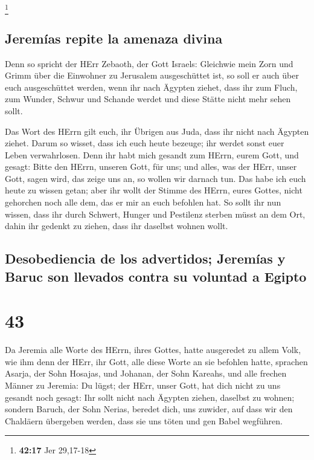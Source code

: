 \footnote{\textbf{42:17} Jer 29,17-18}

\hypertarget{jeremuxedas-repite-la-amenaza-divina}{%
\subsection{Jeremías repite la amenaza
divina}\label{jeremuxedas-repite-la-amenaza-divina}}

 Denn so spricht der HErr Zebaoth, der Gott Israels:
Gleichwie mein Zorn und Grimm über die Einwohner zu Jerusalem
ausgeschüttet ist, so soll er auch über euch ausgeschüttet werden, wenn
ihr nach Ägypten ziehet, dass ihr zum Fluch, zum Wunder, Schwur und
Schande werdet und diese Stätte nicht mehr sehen sollt.

 Das Wort des HErrn gilt euch, ihr Übrigen aus Juda, dass
ihr nicht nach Ägypten ziehet. Darum so wisset, dass ich euch heute
bezeuge;  ihr werdet sonst euer Leben verwahrlosen. Denn
ihr habt mich gesandt zum HErrn, eurem Gott, und gesagt: Bitte den
HErrn, unseren Gott, für uns; und alles, was der HErr, unser Gott, sagen
wird, das zeige uns an, so wollen wir darnach tun.  Das
habe ich euch heute zu wissen getan; aber ihr wollt der Stimme des
HErrn, eures Gottes, nicht gehorchen noch alle dem, das er mir an euch
befohlen hat.  So sollt ihr nun wissen, dass ihr durch
Schwert, Hunger und Pestilenz sterben müsst an dem Ort, dahin ihr
gedenkt zu ziehen, dass ihr daselbst wohnen wollt.

\hypertarget{desobediencia-de-los-advertidos-jeremuxedas-y-baruc-son-llevados-contra-su-voluntad-a-egipto}{%
\subsection{Desobediencia de los advertidos; Jeremías y Baruc son
llevados contra su voluntad a
Egipto}\label{desobediencia-de-los-advertidos-jeremuxedas-y-baruc-son-llevados-contra-su-voluntad-a-egipto}}

\hypertarget{section-42}{%
\section{43}\label{section-42}}

 Da Jeremia alle Worte des HErrn, ihres Gottes, hatte
ausgeredet zu allem Volk, wie ihm denn der HErr, ihr Gott, alle diese
Worte an sie befohlen hatte,  sprachen Asarja, der Sohn
Hosajas, und Johanan, der Sohn Kareahs, und alle frechen Männer zu
Jeremia: Du lügst; der HErr, unser Gott, hat dich nicht zu uns gesandt
noch gesagt: Ihr sollt nicht nach Ägypten ziehen, daselbst zu wohnen;
 sondern Baruch, der Sohn Nerias, beredet dich, uns
zuwider, auf dass wir den Chaldäern übergeben werden, dass sie uns töten
und gen Babel wegführen.

